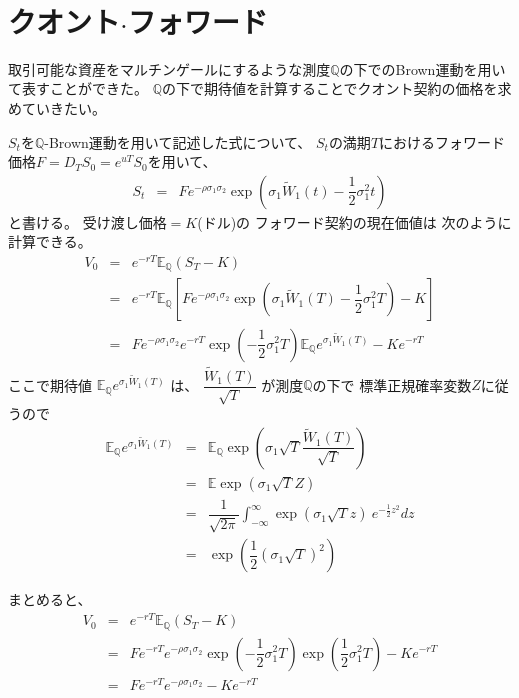 \documentclass[uplatex,a4j,12pt,dvipdfmx]{jsarticle}
\begin{document}
\ \\[-10mm]

\section{クオント$\cdot$フォワード}

取引可能な資産をマルチンゲールにするような測度$\mathbb{Q}$の下でのBrown運動を用いて表すことができた。
$\mathbb{Q}$の下で期待値を計算することでクオント契約の価格を求めていきたい。

$S_{t}$を$\mathbb{Q}$-Brown運動を用いて記述した式について、
$S_{t}$の満期$T$におけるフォワード価格$F = D_{T} S_{0} = e^{uT} S_{0}$を用いて、
%
%
\begin{eqnarray}
	S_{t}
	&=&
	F
	e^{- \rho \sigma_{1} \sigma_{2}}
	\exp \left( \sigma_{1} \tilde{W}_{1}(t) -
	\dfrac{1}{2} \sigma_{1}^{2}
	t \right)
\end{eqnarray}
%
%
と書ける。
受け渡し価格$=K$(ドル)の
フォワード契約の現在価値は
次のように計算できる。
%
%
\begin{eqnarray}
	V_{0}
	&=&
	e^{-rT}
	\mathbb{E}_{\mathbb{Q}}(S_{T}-K)
	\\ &=&
	e^{-rT}
	\mathbb{E}_{\mathbb{Q}}
	\left[
		F
		e^{- \rho \sigma_{1} \sigma_{2}}
		\exp \left( \sigma_{1} \tilde{W}_{1}(T) -
		\dfrac{1}{2} \sigma_{1}^{2}
		T \right)
		-
		K
		\right]
	\\ &=&
	F
	e^{- \rho \sigma_{1} \sigma_{2}}
	e^{-rT}
	\exp \left( -\dfrac{1}{2} \sigma_{1}^{2} T \right)
	\mathbb{E}_{\mathbb{Q}}
	e^{\sigma_{1} \tilde{W}_{1}(T)}
	-
	Ke^{-rT}
\end{eqnarray}
%
%
ここで期待値
$\mathbb{E}_{\mathbb{Q}}
	e^{\sigma_{1} \tilde{W}_{1}(T)}$
は、
$\dfrac{\tilde{W}_{1}(T)}{\sqrt{T}}$
が測度$\mathbb{Q}$の下で
標準正規確率変数$Z$に従うので
%
%
\begin{eqnarray}
	\mathbb{E}_{\mathbb{Q}}
	e^{\sigma_{1} \tilde{W}_{1}(T)}
	&=&
	\mathbb{E}_{\mathbb{Q}}
	\exp \left( \sigma_{1} \sqrt{T} \dfrac{\tilde{W}_{1}(T)}{\sqrt{T}} \right)
	\\ &=&
	\mathbb{E}
	\exp \left( \sigma_{1} \sqrt{T} Z \right)
	\\ &=&
	\dfrac{1}{ \sqrt{2 \pi} }
	\int^{\infty}_{-\infty}
	\exp \left( \sigma_{1} \sqrt{T} z \right)
	\
	e^{-\frac{1}{2}z^{2}}
	dz
	\\ &=&
	\exp \left( \dfrac{1}{2} (\sigma_{1} \sqrt{T})^{2} \right)
\end{eqnarray}
%
%

まとめると、
%
%
\begin{eqnarray}
	V_{0}
	&=&
	e^{-rT}
	\mathbb{E}_{\mathbb{Q}}(S_{T}-K)
	\\ &=&
	F
	e^{-rT}
	e^{- \rho \sigma_{1} \sigma_{2}}
	\exp \left( -\dfrac{1}{2} \sigma_{1}^{2} T \right)
	\exp \left(\dfrac{1}{2} \sigma_{1}^{2} T \right)
	-
	Ke^{-rT}
	\\ &=&
	F
	e^{-rT}
	e^{- \rho \sigma_{1} \sigma_{2}}
	-
	Ke^{-rT}
\end{eqnarray}
%
%
\end{document}
